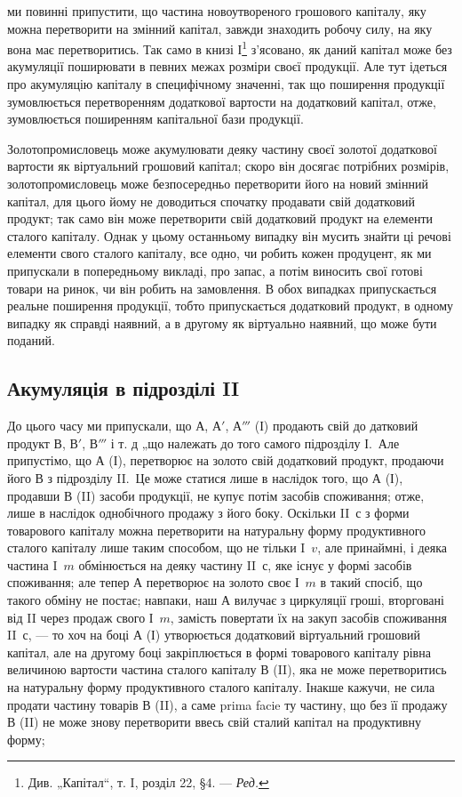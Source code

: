 \parcont{}  %
ми повинні припустити, що частина новоутвореного грошового капіталу,
яку можна перетворити на змінний капітал, завжди знаходить робочу
силу, на яку вона має перетворитись. Так само в книзі І\footnote*{
Див. „Капітал“, т. I, розділ 22, §4. — \emph{Ред.}
} з’ясовано,
як даний капітал може без акумуляції поширювати в певних межах розміри
своєї продукції. Але тут ідеться про акумуляцію капіталу в специфічному
значенні, так що поширення продукції зумовлюється перетворенням
додаткової вартости на додатковий капітал, отже, зумовлюється
поширенням капітальної бази продукції.

Золотопромисловець може акумулювати деяку частину своєї золотої
додаткової вартости як віртуальний грошовий капітал; скоро він досягає
потрібних розмірів, золотопромисловець може безпосередньо перетворити
його на новий змінний капітал, для цього йому не доводиться спочатку
продавати свій додатковий продукт; так само він може перетворити свій
додатковий продукт на елементи сталого капіталу. Однак у цьому останньому
випадку він мусить знайти ці речові елементи свого сталого капіталу,
все одно, чи робить кожен продуцент, як ми припускали в попередньому
викладі, про запас, а потім виносить свої готові товари на ринок,
чи він робить на замовлення. В обох випадках припускається реальне
поширення продукції, тобто припускається додатковий продукт, в
одному випадку як справді наявний, а в другому як віртуально наявний,
що може бути поданий.

\subsection{Акумуляція в підрозділі II}

До цього часу ми припускали, що $А$, $А'$, $А'''$ (І) продають свій до
датковий продукт $В$, $В'$, $В'''$ і т. д „що належать до того самого підрозділу
І.~Але припустімо, що $А$ (І), перетворює на золото свій додатковий
продукт, продаючи його $В$ з підрозділу II.~Це може статися
лише в наслідок того, що $А$ (І), продавши $В$ (II) засоби продукції,
не купує потім засобів споживання; отже, лише в наслідок однобічного
продажу з його боку. Оскільки II~$с$ з форми товарового капіталу можна
перетворити на натуральну форму продуктивного сталого капіталу лише
таким способом, що не тільки I~$v$, але принаймні, і деяка частина I~$m$
обмінюється на деяку частину II~$с$, яке існує у формі засобів споживання;
але тепер А перетворює на золото своє І~$m$ в такий спосіб, що такого
обміну не постає; навпаки, наш $А$ вилучає з циркуляції гроші, вторговані
від II через продаж свого І~$m$, замість повертати їх на закуп засобів
споживання II~$с$, — то хоч на боці $А$ (І) утворюється додатковий
віртуальний грошовий капітал, але на другому боці закріплюється в формі
товарового капіталу рівна величиною вартости частина сталого капіталу
$В$ (II), яка не може перетворитись на натуральну форму продуктивного
сталого капіталу. Інакше кажучи, не сила продати частину товарів
$В$ (II), а саме prima facie ту частину, що без її продажу $В$ (II) не може
знову перетворити ввесь свій сталий капітал на продуктивну форму;
\parbreak{}  %
